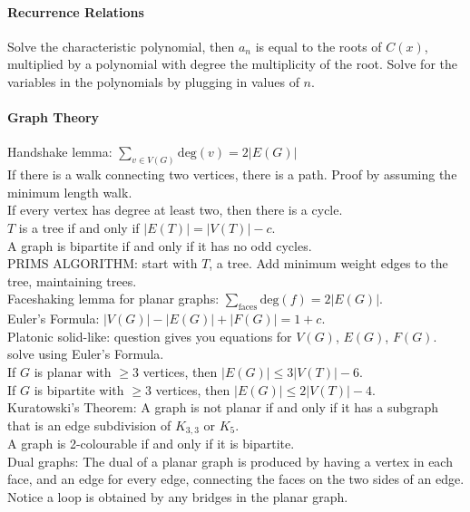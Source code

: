 \documentclass[10pt,letter]{article}
\begin{document}
\paragraph{Recurrence Relations}
Solve the characteristic polynomial, then $a_n$ is equal to the roots of $C(x)$, multiplied by a polynomial with degree the multiplicity of the root. Solve for the variables in the polynomials by plugging in values of $n$. 

\paragraph{Graph Theory}
Handshake lemma: $\sum_{v\in V(G)}\text{deg}(v)=2|E(G)|$ \\ 
If there is a walk connecting two vertices, there is a path. Proof by assuming the minimum length walk. \\ 
If every vertex has degree at least two, then there is a cycle. \\ 
$T$ is a tree if and only if $|E(T)|=|V(T)|-c$. \\ 
A graph is bipartite if and only if it has no odd cycles. \\ 
PRIMS ALGORITHM: start with $T$, a tree. Add minimum weight edges to the tree, maintaining trees. \\
Faceshaking lemma for planar graphs: $\sum_{\text{faces}}\text{deg}(f)=2|E(G)|$. \\ 
Euler's Formula: $|V(G)|-|E(G)|+|F(G)|=1+c$. \\ 
Platonic solid-like: question gives you equations for $V(G)$, $E(G)$, $F(G)$. solve using Euler's Formula.\\
If $G$ is planar with $\geq3$ vertices, then $|E(G)|\leq 3|V(T)|-6$. \\ 
If $G$ is bipartite with $\geq3$ vertices, then $|E(G)|\leq 2|V(T)|-4$. \\ 
Kuratowski's Theorem: A graph is not planar if and only if it has a subgraph that is an edge subdivision of $K_{3,3}$ or $K_5$. \\ 
A graph is 2-colourable if and only if it is bipartite. \\ 
Dual graphs: The dual of a planar graph is produced by having a vertex in each face, and an edge for every edge, connecting the faces on the two sides of an edge. Notice a loop is obtained by any bridges in the planar graph. \\ 
\end{document}

